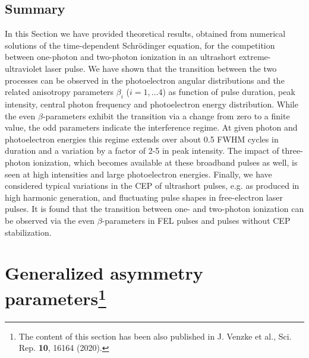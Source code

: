 \subsection{Summary}
In this Section we have provided theoretical results, obtained from numerical solutions of the time-dependent Schr\"odinger equation, for the competition between one-photon and two-photon ionization in an ultrashort extreme-ultraviolet laser pulse. We have shown that the transition between the two processes can be observed in the photoelectron angular distributions and the related anisotropy parameters $\beta_i$ ($i = 1, \ldots 4$) as function of pulse duration, peak intensity, central photon frequency and photoelectron energy distribution. While the even $\beta$-parameters exhibit the transition via a change from zero to a finite value, the odd parameters indicate the interference regime. At given photon and photoelectron energies this regime extends over about 0.5 FWHM cycles in duration and a variation by a factor of 2-5 in peak intensity. The impact of three-photon ionization, which becomes available at these broadband pulses as well, is seen at high intensities and large photoelectron energies. Finally, we have considered typical variations in the CEP of ultrashort pulses, e.g. as produced in high harmonic generation, and fluctuating pulse shapes in free-electron laser pulses. It is found that the transition between one- and two-photon ionization can be observed via the even $\beta$-parameters in FEL pulses and pulses without CEP stabilization.


\section[Generalized asymmetry parameters]{Generalized asymmetry parameters\protect\footnote{The content of this section has been also published in J. Venzke et al., Sci. Rep. \textbf{10}, 16164 (2020).}} %
\label{sec:generalized_asymmetry_parameters}



